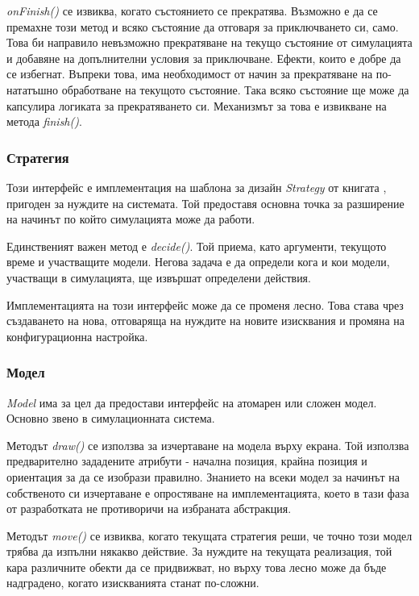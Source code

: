 		\emph{onFinish()} се извиква, когато състоянието се прекратява. Възможно е да се премахне този метод и 
		всяко състояние да отговаря за приключването си, само. Това би направило невъзможно
		прекратяване на текущо състояние от симулацията и добавяне на допълнителни условия за приключване. 
		Ефекти, които е добре да се избегнат. Въпреки това, има необходимост от начин за прекратяване на по-нататъшно обработване
		на текущото състояние. Така всяко състояние ще може да капсулира логиката за прекратяването си. Механизмът
		за това е извикване на метода \emph{finish()}.
		
		\subsubsection{Стратегия}
		
		Този интерфейс е имплементация на шаблона за дизайн \emph{Strategy} от книгата \cite{Gamma}, 
		пригоден за нуждите на системата. Той предоставя основна точка за разширение на начинът
		по който симулацията може да работи.
		
		Единственият важен метод е \emph{decide()}. Той приема, като аргументи, текущото време и участващите модели.
		Негова задача е да определи кога и кои модели, участващи в симулацията, ще извършат определени действия.
		
		Имплементацията на този интерфейс може да се променя лесно. Това става чрез създаването на нова, отговаряща
		на нуждите на новите изисквания и промяна на конфигурационна настройка.

		\subsubsection{Модел}		
		
		\emph{Model} има за цел да предостави интерфейс на атомарен или сложен модел. Основно
		звено в симулационната система.		
		
		Методът \emph{draw()} се използва за изчертаване на модела върху екрана. Той използва
		предварително зададените атрибути - начална позиция, крайна позиция и ориентация за
		да се изобрази правилно. Знанието на всеки модел за начинът на собственото си изчертаване
		е опростяване на имплементацията, което в тази фаза от разработката не противоричи
		на избраната абстракция.
		
		Методът \emph{move()} се извиква, когато текущата стратегия реши, че точно този модел
		трябва да изпълни някакво действие. За нуждите на текущата реализация, той кара
		различните обекти да се придвижват, но върху това лесно може да бъде надградено,
		когато изискванията станат по-сложни.
